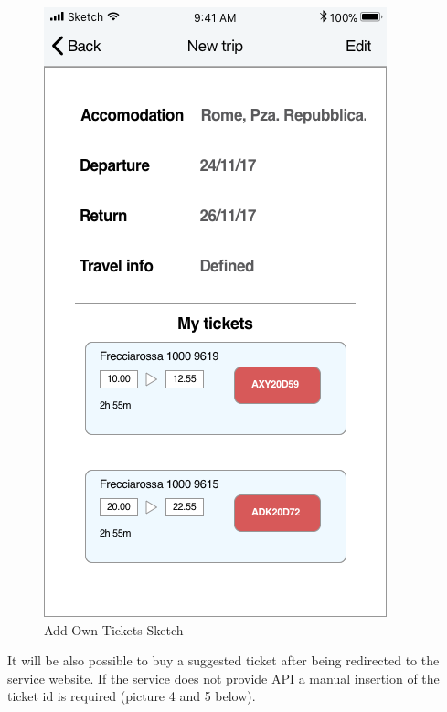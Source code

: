 \begin{figure}[H]
	\hspace{0.5cm}
	\includegraphics[scale=0.23]{Images/Interface/Trips/10_trip_review}
	\caption{Add Own Tickets Sketch}
\end{figure}
It will be also possible to buy a suggested ticket after being redirected to the service website. If the service does not provide API a manual insertion of the ticket id is required (picture 4 and 5 below).
